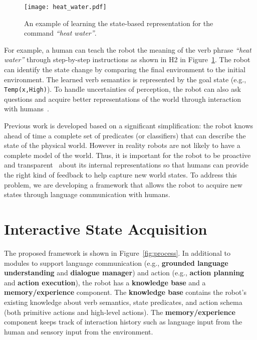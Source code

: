 \documentclass[letterpaper]{article} %
\begin{document}
\begin{figure}
\texttt{[image: heat\_water.pdf]}
\centering
\vspace{-10pt}
\caption{An example of learning the state-based representation for the command {\em``heat water''}.}
\label{fig:boil}
\vspace{-5pt}
\end{figure}

For example, a human can teach the robot the meaning of the verb phrase {\em ``heat water''} through step-by-step instructions as shown in H2 in Figure~\ref{fig:boil}. The robot can identify the state change by comparing the final environment to the initial environment. The learned verb semantics is represented by the goal state (e.g., \texttt{Temp(x,High)}). To handle uncertainties of perception, the robot can also ask questions and acquire better representations of the world through interaction with humans~\cite{she2017interactive}.

Previous work is developed based on a significant simplification: the robot knows ahead of time a complete set of predicates (or classifiers) that can describe the state of the physical world. However in reality robots are not likely to have a complete model of the world.
Thus, it is important for the robot to be proactive~\cite{chai2014,chai2016} and transparent~\cite{alexandrova2014,alexandrova2015,whitney2016,hayes2017} about its internal representations so that humans can provide the right kind of feedback to help capture new world states. To address this problem, we are developing a framework that allows the robot to acquire new states through language communication with humans.  

\section{Interactive State Acquisition}

The proposed framework is shown in Figure~\ref{fig:process}. In additional to modules to support language communication (e.g., {\bf grounded language understanding} and {\bf dialogue manager}) and action (e.g., {\bf action planning} and {\bf action execution}), the robot has a {\bf knowledge base} and a {\bf memory/experience} component. The {\bf knowledge base} contains the robot's existing knowledge about verb semantics, state predicates, and action schema (both primitive actions and high-level actions). The {\bf memory/experience} component keeps track of interaction history such as language input from the human and sensory input from the environment. 
\end{document}

